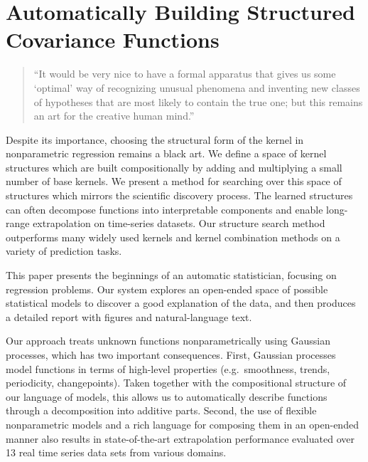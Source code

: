 
\inbpdocument


\chapter{Automatically Building Structured Covariance Functions}
\label{ch:grammar}

\begin{quotation}
``It would be very nice to have a formal apparatus that gives us some `optimal' way of recognizing unusual phenomena and inventing new classes of hypotheses that are most likely to contain the true one; but this remains an art for the creative human mind.''

\hspace*{\fill}
\end{quotation}


Despite its importance, choosing the structural form of the kernel in nonparametric regression remains a black art.
We define a space of kernel structures which are built compositionally by adding and multiplying a small number of base kernels.
We present a method for searching over this space of structures which mirrors the scientific discovery process.
The learned structures can often decompose functions into interpretable components and enable long-range extrapolation on time-series datasets.
Our structure search method outperforms many widely used kernels and kernel combination methods on a variety of prediction tasks.



This paper presents the beginnings of an automatic statistician, focusing on regression problems.
Our system explores an open-ended space of possible statistical models to discover a good explanation of the data, and then produces a detailed report with figures and natural-language text.

Our approach treats unknown functions nonparametrically using Gaussian processes, which has two important consequences.
First, Gaussian processes model functions in terms of high-level properties (e.g.\ smoothness, trends, periodicity,
changepoints).
Taken together with the compositional structure of our language of models, this allows us to automatically describe functions through a decomposition into additive parts.
Second, the use of flexible nonparametric models and a rich
language for composing them in an open-ended manner also results
in state-of-the-art extrapolation performance evaluated over 13 real time
series data sets from various domains.


